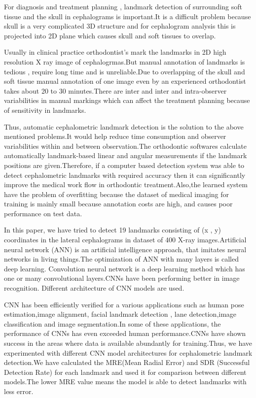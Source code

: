 \documentclass[sn-mathphys]{sn-jnl}%
\theoremstyle{thmstyleone}%
\theoremstyle{thmstyletwo}%
\theoremstyle{thmstylethree}%
\begin{document}
\par For diagnosis and treatment planning , landmark detection of surrounding soft tissue and the skull in cephalograms is important.It is a difficult problem because skull is a very complicated 3D structure and for cephalogram analysis this is projected into 2D plane which causes skull and soft tissues to overlap.
 
\par Usually in clinical practice orthodontist's mark the landmarks in 2D high resolution X ray image of cephalogrmas.But manual annotation of landmarks is tedious , require long time and is unreliable.Due to overlapping of the skull and soft tissue  manual annotation of one image even by an experienced orthodontist takes about 20 to 30 minutes.There are inter and inter and intra-observer variabilities in manual markings which can affect the treatment planning because of  sensitivity in landmarks.

\par Thus, automatic cephalometric landmark detection is the solution to the above mentioned  problems.It would help reduce time consumption and observer variabilities within and between observation.The orthodontic softwares calculate automatically landmark-based linear and angular measurements if the landmark positions are given.Therefore, if a computer based detection system was able to detect cephalometric landmarks with required accuracy then it can significantly improve the medical work flow in orthodontic treatment.Also,the learned system have the problem of overfitting because the dataset of medical imaging for training is mainly small because annotation costs are high, and causes poor performance on test data.
        
\par In this paper, we have tried to detect 19 landmarks consisting of (x , y) coordinates in the lateral cephalograms in dataset of 400 X-ray images.Artificial neural network (ANN) is an artificial intelligence approach, that imitates neural networks in living things.The optimization of ANN with many layers is called deep learning. Convolution neural network is a deep learning method which has one or many convolutional layers.CNNs have been performing better in image recognition. Different architecture of CNN models are used.
\par CNN has been efficiently verified for a various applications such as human pose estimation,image alignment,  facial landmark detection , lane detection,image classification and image segmentation.In some of these applications, the performance of CNNs has even exceeded human performance.CNNs have shown success in the areas where data is available abundantly for training.Thus, we have experimented with different CNN model architectures for  cephalometric  landmark detection.We have calculated the MRE(Mean Radial Error) and SDR (Successful Detection Rate) for each landmark and used it for comparison between different models.The lower MRE value means the model is able to detect landmarks with less error. 
\end{document}
